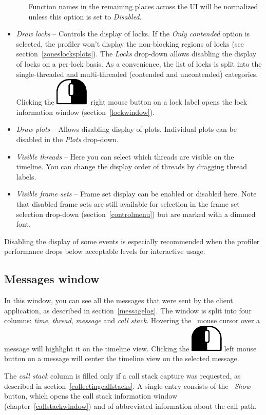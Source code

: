 \documentclass[hidelinks,titlepage,a4paper]{article}
\newcommand{\LMB}{\includegraphics[height=.8\baselineskip]{icons/lmb}}
\newcommand{\RMB}{\includegraphics[height=.8\baselineskip]{icons/rmb}}
\begin{document}
\begin{itemize}
\begin{itemize}
\begin{itemize}
\end{itemize}
Function names in the remaining places across the UI will be normalized unless this option is set to \emph{Disabled}.
\end{itemize}
\item \emph{\faLock{} Draw locks} -- Controls the display of locks. If the \emph{Only contended} option is selected, the profiler won't display the non-blocking regions of locks (see section~\ref{zoneslocksplots}). The \emph{Locks} drop-down allows disabling the display of locks on a per-lock basis. As a convenience, the list of locks is split into the single-threaded and multi-threaded (contended and uncontended) categories. Clicking the \RMB{}~right mouse button on a lock label opens the lock information window (section~\ref{lockwindow}).
\item \emph{\faSignature{} Draw plots} -- Allows disabling display of plots. Individual plots can be disabled in the \emph{Plots} drop-down.
\item \emph{\faRandom{} Visible threads} -- Here you can select which threads are visible on the timeline. You can change the display order of threads by dragging thread labels.
\item \emph{\faImages{} Visible frame sets} -- Frame set display can be enabled or disabled here. Note that disabled frame sets are still available for selection in the frame set selection drop-down (section~\ref{controlmenu}) but are marked with a dimmed font.
\end{itemize}

Disabling the display of some events is especially recommended when the profiler performance drops below acceptable levels for interactive usage.

\subsection{Messages window}
\label{messages}

In this window, you can see all the messages that were sent by the client application, as described in section~\ref{messagelog}. The window is split into four columns: \emph{time}, \emph{thread}, \emph{message} and \emph{call stack}. Hovering the \faMousePointer{}~mouse cursor over a message will highlight it on the timeline view. Clicking the \LMB{} left mouse button on a message will center the timeline view on the selected message.

The \emph{call stack} column is filled only if a call stack capture was requested, as described in section~\ref{collectingcallstacks}. A single entry consists of the \emph{\faAlignJustify{}~Show} button, which opens the call stack information window (chapter~\ref{callstackwindow}) and of abbreviated information about the call path.
\end{document}
